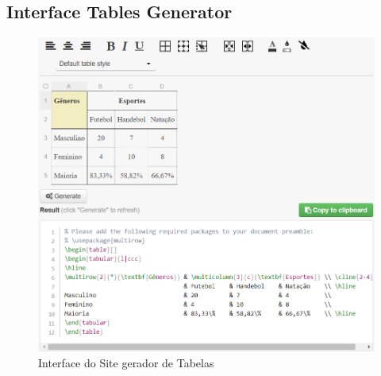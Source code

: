 
\begin{appendices}
    \section{Interface Tables Generator}

    \begin{figure}[htb]
        \centering
        \includegraphics[width=\textwidth]{images/tables_generator_interface.png}
        \caption{Interface do Site gerador de Tabelas}
        \label{fig:interface}
    \end{figure}
\end{appendices}